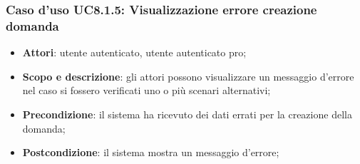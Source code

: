 	\subsubsection{Caso d'uso UC8.1.5: Visualizzazione errore creazione domanda}
	\begin{itemize}
		\item
			\textbf{Attori}: utente autenticato, utente autenticato pro;
		\item
			\textbf{Scopo e descrizione}: gli attori possono visualizzare un messaggio d'errore nel caso si fossero verificati uno o più scenari alternativi;
		\item		
			\textbf{Precondizione}: il sistema ha ricevuto dei dati errati per la creazione della domanda;
		\item
			\textbf{Postcondizione}: il sistema mostra un messaggio d'errore;
	\end{itemize}	






